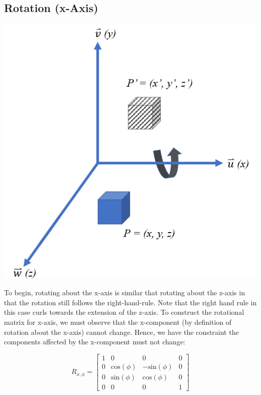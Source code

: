 \documentclass[12pt,letterpaper]{article}
\begin{document}
\subsection{Rotation (x-Axis)}
\includegraphics[scale=0.75]{xRotation}

To begin, rotating about the x-axis is similar that rotating about the z-axis in that the rotation still follows the right-hand-rule. Note that the right hand rule in this case curls towards the extension of the z-axis. To construct the rotational matrix for x-axis, we must observe that the x-component (by definition of rotation about the x-axis) cannot change. Hence, we have the constraint the components affected by the x-component must not change:

\begin{equation}
    R_{x, \phi} = \begin{bmatrix}
        1 & 0 & 0 & 0 \\
        0 & \text{cos}(\phi) & -\text{sin}(\phi) & 0 \\
        0 & \text{sin}(\phi) &  \text{cos}(\phi) & 0 \\
        0 & 0 & 0 & 1
    \end{bmatrix}
\end{equation}

\newpage
\end{document}
